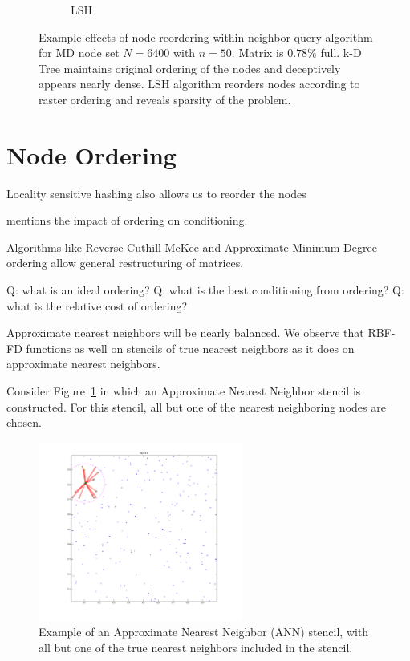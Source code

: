 \documentclass{report}
\begin{document}
\begin{figure}
\begin{subfigure}{0.425\textwidth}
\caption{LSH}
\end{subfigure}
\caption{Example effects of node reordering within neighbor query algorithm for MD node set $N=6400$ with $n=50$. Matrix is $0.78\%$ full. k-D Tree maintains original ordering of the nodes and deceptively appears nearly dense. LSH algorithm reorders nodes according to raster ordering and reveals sparsity of the problem.  }
\end{figure} 

\section{Node Ordering}

Locality sensitive hashing also allows us to reorder the nodes

\cite{Saad2003} mentions the impact of ordering on conditioning.

Algorithms like Reverse Cuthill McKee and Approximate Minimum Degree ordering allow general restructuring of matrices. 


Q: what is an ideal ordering?
Q: what is the best conditioning from ordering?
Q: what is the relative cost of ordering?






Approximate nearest neighbors will be nearly balanced. 
We observe that RBF-FD functions as well on stencils of true nearest neighbors as it does on approximate nearest neighbors.

Consider Figure~\ref{fig:ann_stencil} in which an Approximate Nearest Neighbor stencil is constructed. For this stencil, all but one of the nearest neighboring nodes are chosen. 

\begin{figure}
\centering
\includegraphics[width=0.6\textwidth]{rbffd_methods_content/neighbors/neighbor_incorrect.png}
\caption{Example of an Approximate Nearest Neighbor (ANN) stencil, with all but one of the true nearest neighbors included in the stencil. }
\label{fig:ann_stencil}
\end{figure}
\end{document}
